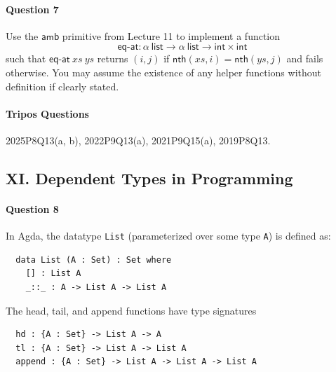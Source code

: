 \documentclass[11pt,a4paper,twoside]{article}
\begin{document}
\paragraph{Question 7} Use the $\mathsf{amb}$ primitive from Lecture
11 to implement a function
\[
  \mathsf{eq\text{-}at} : \alpha\ \mathsf{list} \to
  \alpha\ \mathsf{list} \to \mathsf{int} \times \mathsf{int}
\]
such that $\mathsf{eq\text{-}at}\ xs\ ys$ returns $(i,j)$
if $\mathsf{nth}(xs, i) = \mathsf{nth}(ys, j)$ and fails otherwise.
You may assume the existence of any helper functions without
definition if clearly stated.


\paragraph{Tripos Questions} 2025P8Q13(a, b), 2022P9Q13(a), 2021P9Q15(a), 2019P8Q13.

\subsection*{XI. Dependent Types in Programming}

\paragraph{Question 8}
In Agda, the datatype \texttt{List} (parameterized over some type \texttt{A})
is defined as:
\begin{lstlisting}
  data List (A : Set) : Set where
    [] : List A
    _::_ : A -> List A -> List A
\end{lstlisting}
The head, tail, and append functions have type signatures
\begin{lstlisting}
  hd : {A : Set} -> List A -> A
  tl : {A : Set} -> List A -> List A
  append : {A : Set} -> List A -> List A -> List A
\end{lstlisting}

\vspace{-0.5em}
\end{document}
